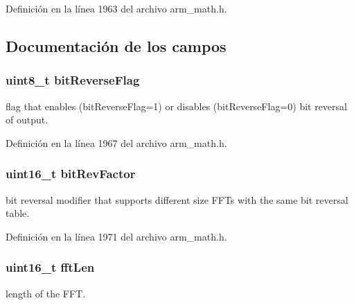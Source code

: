Definición en la línea 1963 del archivo arm\+\_\+math.\+h.



\subsection{Documentación de los campos}
\subsubsection[{\texorpdfstring{bit\+Reverse\+Flag}{bitReverseFlag}}]{\setlength{\rightskip}{0pt plus 5cm}uint8\+\_\+t bit\+Reverse\+Flag}\hypertarget{structarm__cfft__radix2__instance__q15_a09a221a818c6d0e064557a99e2fe9a8b}{}\label{structarm__cfft__radix2__instance__q15_a09a221a818c6d0e064557a99e2fe9a8b}
flag that enables (bit\+Reverse\+Flag=1) or disables (bit\+Reverse\+Flag=0) bit reversal of output. 

Definición en la línea 1967 del archivo arm\+\_\+math.\+h.

\subsubsection[{\texorpdfstring{bit\+Rev\+Factor}{bitRevFactor}}]{\setlength{\rightskip}{0pt plus 5cm}uint16\+\_\+t bit\+Rev\+Factor}\hypertarget{structarm__cfft__radix2__instance__q15_a33386d95319dc3ee7097b3a8e52e01ec}{}\label{structarm__cfft__radix2__instance__q15_a33386d95319dc3ee7097b3a8e52e01ec}
bit reversal modifier that supports different size F\+F\+Ts with the same bit reversal table. 

Definición en la línea 1971 del archivo arm\+\_\+math.\+h.

\subsubsection[{\texorpdfstring{fft\+Len}{fftLen}}]{\setlength{\rightskip}{0pt plus 5cm}uint16\+\_\+t fft\+Len}\hypertarget{structarm__cfft__radix2__instance__q15_ab8db3bbe7c61e6bb8ca2a55e3446e11a}{}\label{structarm__cfft__radix2__instance__q15_ab8db3bbe7c61e6bb8ca2a55e3446e11a}
length of the F\+FT. 

